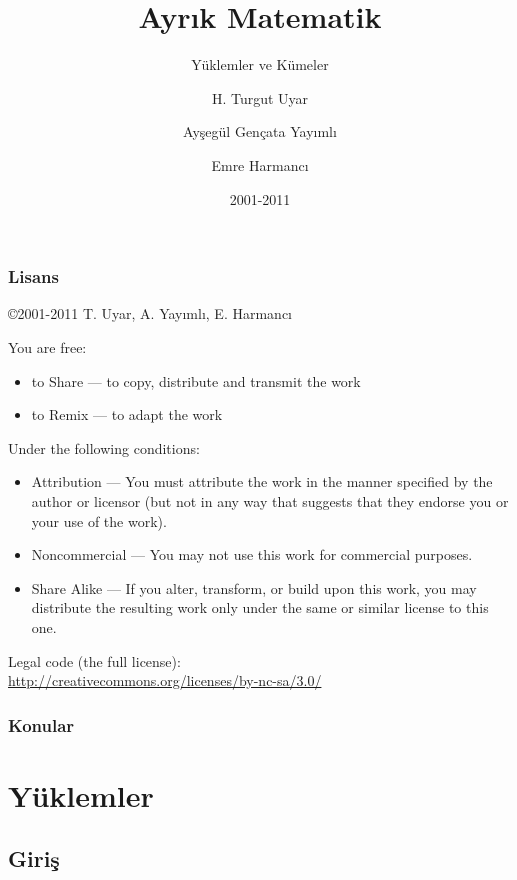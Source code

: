 \documentclass[dvipsnames]{beamer}
\title{Ayrık Matematik}
\subtitle{Yüklemler ve Kümeler}
\author{H. Turgut Uyar \and Ayşegül Gençata Yayımlı \and Emre Harmancı}
\date{2001-2011}
\theoremstyle{definition}
\theoremstyle{example}
\theoremstyle{plain}
\begin{document}
\begin{frame}
  \titlepage
\end{frame}

\begin{frame}
  \frametitle{Lisans}

  \hfill
  \copyright 2001-2011 T. Uyar, A. Yayımlı, E. Harmancı

  \vfill
  \begin{tiny}
    You are free:
    \begin{itemize}
      \item to Share — to copy, distribute and transmit the work
      \item to Remix — to adapt the work
    \end{itemize}

    Under the following conditions:
    \begin{itemize}
      \item Attribution — You must attribute the work in the manner specified by
        the author or licensor (but not in any way that suggests that they
        endorse you or your use of the work).

      \item Noncommercial — You may not use this work for commercial purposes.

      \item Share Alike — If you alter, transform, or build upon this work, you
        may distribute the resulting work only under the same or similar license
        to this one.
    \end{itemize}
  \end{tiny}

  \vfill
  Legal code (the full license):\\
  \url{http://creativecommons.org/licenses/by-nc-sa/3.0/}
\end{frame}

\begin{frame}
  \frametitle{Konular}
  \tableofcontents
\end{frame}

\section{Yüklemler}

\subsection{Giriş}
\end{document}
